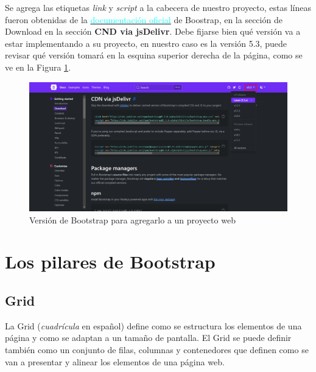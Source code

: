 Se agrega las etiquetas \textit{link} y \textit{script} a la cabecera de nuestro proyecto, estas líneas fueron obtenidas de la \href{https://getbootstrap.com/docs/5.3/getting-started/download/#cdn-via-jsdelivr}{\textcolor{cyan}{documentación oficial}} de Boostrap, en la sección de Download en la sección \textbf{CND via jsDelivr}. Debe fijarse bien qué versión va a estar implementando a su proyecto, en nuestro caso es la versión 5.3, puede revisar qué versión tomará en la esquina superior derecha de la página, como se ve en la Figura \ref{fig:1}.
\begin{figure}[H]
    \centering
    \caption{Versión de Bootstrap para agregarlo a un proyecto web}
    \label{fig:1}
    \includegraphics[width=\textwidth]{ss/version-bootstrap.png}
\end{figure}



\section{Los pilares de Bootstrap}


\subsection{Grid}

La Grid (\textit{cuadrícula} en español) define como se estructura los elementos de una página y como se adaptan a un tamaño de pantalla. El Grid se puede definir también como un conjunto de filas, columnas y contenedores que definen como se van a presentar y alinear los elementos de una página web.

